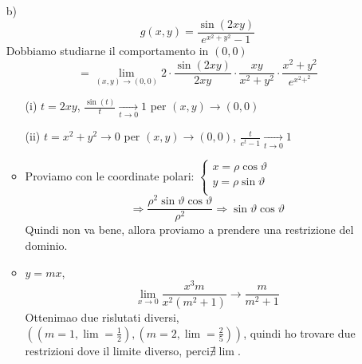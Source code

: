 \begin{eexercise}
\begin{enumerate}
\begin{itemize}
                \end{itemize}
    \item[b)] $$g(x,y) = \frac{\sin(2xy)}{e^{x^2+y^2}-1}$$
              Dobbiamo studiarne il comportamento in $(0,0)$
              $$ = \lim_{(x,y)\to (0,0)} 2\cdot \frac{\sin(2xy)}{2xy}\cdot \frac{xy}{x^2+y^2} \cdot \frac{x^2+y^2}{e^{x^2+^2}}$$
              \begin{itemize}
                \item[(i)] $t = 2xy$, $\frac{\sin(t)}{t} \xrightarrow[t\to 0]{} 1$ per $(x,y)\to (0,0)$
                \item[(ii)] $t = x^2+y^2 \to 0$ per $(x,y)\to (0,0)$, $\frac{t}{e^t-1} \xrightarrow[t\to 0]{} 1$
              \end{itemize}
              \begin{itemize}
                \item Proviamo con le coordinate polari: $\left\{\begin{array}{l}
                        x = \rho\cos\vartheta \\
                        y = \rho\sin\vartheta \\
                      \end{array}\right.$
                      $$\Rightarrow \frac{\rho^2\sin\vartheta\cos\vartheta}{\rho^2} \Rightarrow \sin\vartheta\cos\vartheta$$
                      Quindi non va bene, allora proviamo a prendere una restrizione del dominio.
                \item $y = mx$, 
                      $$\lim_{x \to 0} \frac{x^3m}{x^2(m^2+1)} \rightarrow \frac{m}{m^2+1}$$
                      Ottenimao due rislutati diversi, $\left((m=1,\lim=\frac{1}{2}), (m=2,\lim = \frac{2}{5})\right)$,
                      quindi ho trovare due restrizioni dove il limite \ace diverso, perci\aco $\nexists \lim$.
              \end{itemize}
  \end{enumerate}
\end{eexercise}
